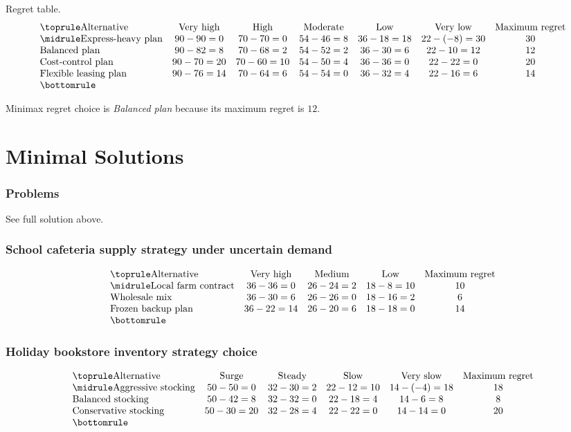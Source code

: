 \begin{ExamProblems}
		Regret table.
		\[
		\begin{array}{lcccccc}
			\toprule
			\text{Alternative} & \text{Very high} & \text{High} & \text{Moderate} & \text{Low} & \text{Very low} & \text{Maximum regret}\\
			\midrule
			\text{Express-heavy plan} & 90-90=0 & 70-70=0 & 54-46=8 & 36-18=18 & 22-(-8)=30 & 30\\
			\text{Balanced plan} & 90-82=8 & 70-68=2 & 54-52=2 & 36-30=6 & 22-10=12 & 12\\
			\text{Cost-control plan} & 90-70=20 & 70-60=10 & 54-50=4 & 36-36=0 & 22-22=0 & 20\\
			\text{Flexible leasing plan} & 90-76=14 & 70-64=6 & 54-54=0 & 36-32=4 & 22-16=6 & 14\\
			\bottomrule
		\end{array}
		\]

		Minimax regret choice is \emph{Balanced plan} because its maximum regret is $12$.
	\end{ExamProblems}


\part{Minimal Solutions}

\section*{Problems}
See full solution above.

\section*{School cafeteria supply strategy under uncertain demand}
\[\begin{array}{lcccc}
			\toprule
			\text{Alternative} & \text{Very high} & \text{Medium} & \text{Low} & \text{Maximum regret}\\
			\midrule
			\text{Local farm contract} & 36-36=0 & 26-24=2 & 18-8=10 & 10\\
			\text{Wholesale mix} & 36-30=6 & 26-26=0 & 18-16=2 & 6\\
			\text{Frozen backup plan} & 36-22=14 & 26-20=6 & 18-18=0 & 14\\
			\bottomrule
		\end{array}\]

\section*{Holiday bookstore inventory strategy choice}
\[\begin{array}{lccccc}
			\toprule
			\text{Alternative} & \text{Surge} & \text{Steady} & \text{Slow} & \text{Very slow} & \text{Maximum regret}\\
			\midrule
			\text{Aggressive stocking} & 50-50=0 & 32-30=2 & 22-12=10 & 14-(-4)=18 & 18\\
			\text{Balanced stocking} & 50-42=8 & 32-32=0 & 22-18=4 & 14-6=8 & 8\\
			\text{Conservative stocking} & 50-30=20 & 32-28=4 & 22-22=0 & 14-14=0 & 20\\
			\bottomrule
		\end{array}\]

